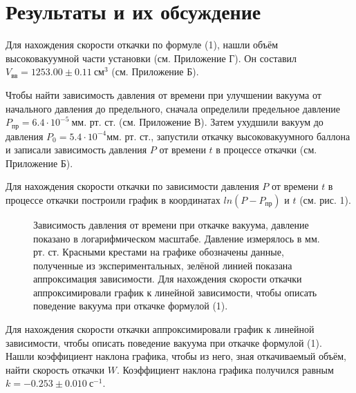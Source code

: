 \chapter{Результаты и их обсуждение}
\label{ch:results}

Для нахождения скорости откачки по формуле (1), нашли объём высоковакуумной части установки (см. Приложение Г). Он составил $V_\text{вв} = 1253.00 \pm 0.11 \ \text{см}^3$ (см. Приложение Б).

Чтобы найти зависимость давления от времени при улучшении вакуума от начального давления до предельного, сначала определили предельное давление $P_\text{пр} = 6.4 
\cdot 10^{-5} \ \text{мм. рт. ст.}$ (см. Приложение В). Затем ухудшили вакуум до давления $P_0 = 5.4 \cdot 10^{-4} \text{мм. рт. ст.}$, запустили откачку высоковакуумного баллона и записали зависимость давления $P$ от времени $t$ в процессе откачки (см. Приложение Б).

Для нахождения скорости откачки по зависимости давления $P$ от времени $t$ в процессе откачки построили график в координатах $ln (P - P_\text{пр})$ и $t$ (см. рис. 1).


\begin{figure}[ht]
\center{}  
\vspace{-20pt}
\caption{Зависимость давления от времени при откачке вакуума, давление показано в логарифмическом масштабе. Давление измерялось в мм. рт. ст. %
Красными крестами на графике обозначены данные, полученные из экспериментальных, зелёной линией показана аппроксимация зависимости. Для нахождения скорости откачки аппроксимировали график к линейной зависимости, чтобы описать поведение вакуума при откачке формулой (1).}
\label{fig:lnp(t)}
\end{figure}

Для нахождения скорости откачки аппроксимировали график к линейной зависимости, чтобы описать поведение вакуума при откачке формулой (1). Нашли коэффициент наклона графика, чтобы из него, зная откачиваемый объём, найти скорость откачки $W$. Коэффициент наклона графика получился равным $k = - 0.253  \ ^{-1}$.

